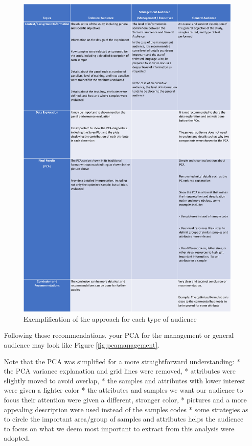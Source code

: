 \documentclass[
]{krantz}
\begin{document}
\begin{figure}

{\centering \includegraphics[width=1\linewidth]{images/table_value_delivery_2} 

}

\caption{Exemplification of the approach for each type of audience}\label{fig:summarytable1}
\end{figure}

Following those recommendations, your PCA for the management or general audience may look like Figure \ref{fig:pcamanagement}.

Note that the PCA was simplified for a more straightforward understanding:
* the PCA variance explanation and grid lines were removed,
* attributes were slightly moved to avoid overlap,
* the samples and attributes with lower interest were given a lighter color
* the attributes and samples we want our audience to focus their attention were given a different, stronger color,
* pictures and a more appealing description were used instead of the samples codes
* some strategies as to circle the important area/group of samples and attributes helps the audience to focus on what we deem most important to extract from this analysis were adopted.
\end{document}
